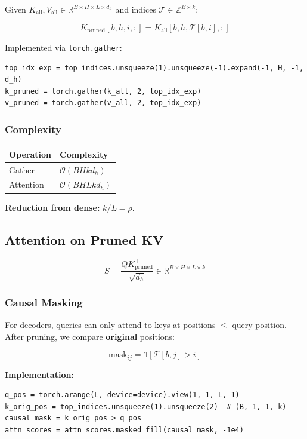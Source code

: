{Given $K_\text{all}, V_\text{all} \in \mathbb{R}^{B \times H \times L \times d_h}$ 
and indices $\mathcal{T} \in \mathbb{Z}^{B \times k}$:

\[
K_\text{pruned}[b, h, i, :] = K_\text{all}[b, h, \mathcal{T}[b, i], :]
\tag{4.3}
\]

Implemented via \texttt{torch.gather}:

\begin{lstlisting}
top_idx_exp = top_indices.unsqueeze(1).unsqueeze(-1).expand(-1, H, -1, d_h)
k_pruned = torch.gather(k_all, 2, top_idx_exp)
v_pruned = torch.gather(v_all, 2, top_idx_exp)
\end{lstlisting}

\subsubsection{Complexity}

\begin{table}[H]
\centering
\small
\begin{tabular}{ll}
\toprule
\textbf{Operation} & \textbf{Complexity} \\
\midrule
Gather & $\mathcal{O}(B H k d_h)$ \\
Attention & $\mathcal{O}(B H L k d_h)$ \\
\bottomrule
\end{tabular}
\end{table}

\textbf{Reduction from dense:} $k / L = \rho$.

\subsection{Attention on Pruned KV}

\[
S = \frac{Q K_\text{pruned}^\top}{\sqrt{d_h}} \in \mathbb{R}^{B \times H \times L \times k}
\tag{4.4}
\]

\subsubsection{Causal Masking}

For decoders, queries can only attend to keys at positions $\leq$ query 
position. After pruning, we compare \textbf{original} positions:

\[
\text{mask}_{ij} = \mathbb{1}[\mathcal{T}[b, j] > i]
\tag{4.5}
\]

\textbf{Implementation:}

\begin{lstlisting}
q_pos = torch.arange(L, device=device).view(1, 1, L, 1)
k_orig_pos = top_indices.unsqueeze(1).unsqueeze(2)  # (B, 1, 1, k)
causal_mask = k_orig_pos > q_pos
attn_scores = attn_scores.masked_fill(causal_mask, -1e4)
\end{lstlisting}

}
